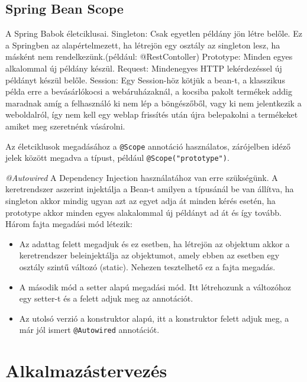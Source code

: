 \subsection{Spring Bean Scope}

A Spring Babok életciklusai.
Singleton: Csak egyetlen példány jön létre belőle. Ez a Springben az alapértelmezett, ha létrejön egy osztály az singleton lesz, ha másként nem rendelkezünk.(például: @RestContoller)
Prototype: Minden egyes alkalommal új példány készül.
Request: Mindenegyes HTTP lekérdezéssel új példányt készül belőle.
Session: Egy Session-höz kötjük a bean-t, a klasszikus példa erre a bevásárlókocsi a webáruházaknál, a kocsiba pakolt termékek addig maradnak amíg a felhasználó ki nem lép a böngészőből, vagy ki nem jelentkezik a weboldalról, így nem kell egy weblap frissítés után újra belepakolni a termékeket amiket meg szeretnénk vásárolni.

Az életciklusok megadásához a \texttt{@Scope} annotáció használatos, zárójelben idéző jelek között megadva a típust, például \texttt{@Scope("prototype")}.

\textit{@Autowired}
A Dependency Injection használatához van erre szükségünk. A keretrendszer aszerint injektálja a Bean-t amilyen a típusánál be van állítva, ha singleton akkor mindig ugyan azt az egyet adja át minden kérés esetén, ha prototype akkor minden egyes alakalommal új példányt ad át és így tovább.
Három fajta megadási mód létezik:
\begin{itemize}
\item Az adattag felett megadjuk és ez esetben, ha létrejön az objektum akkor a keretrendszer beleinjektálja az objektumot, amely ebben az esetben egy osztály szintű változó (static). Nehezen tesztelhető ez a fajta megadás.

\item A második mód a setter alapú megadási mód. Itt létrehozunk a változóhoz egy setter-t és a felett adjuk meg az annotációt.

\item Az utolsó verzió a konstruktor alapú, itt a konstruktor felett adjuk meg, a már jól ismert \texttt{@Autowired} annotációt.
\end{itemize}

\section{Alkalmazástervezés}

